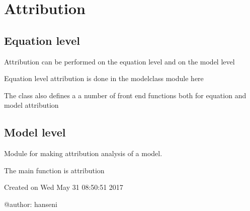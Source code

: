 \documentclass[letterpaper,10pt,english]{sphinxmanual}
\begin{document}
\chapter{Attribution}
\label{\detokenize{index:attribution}}

\section{Equation level}
\label{\detokenize{index:equation-level}}
\sphinxAtStartPar
Attribution can be performed on the equation level and on the model level

\sphinxAtStartPar
Equation level attribution is done in the modelclass module here  {\hyperref[\detokenize{index:modelclass.Dekomp_Mixin}]{}}

\sphinxAtStartPar
The class {\hyperref[\detokenize{index:modelclass.Dekomp_Mixin}]{}} also defines a a number of front end functions both for equation and model attribution


\section{Model level}
\label{\detokenize{index:module-modeldekom}}\label{\detokenize{index:model-level}}
\sphinxAtStartPar
Module for making attribution analysis of a model.

\sphinxAtStartPar
The main function is attribution

\sphinxAtStartPar
Created on Wed May 31 08:50:51 2017

\sphinxAtStartPar
@author: hanseni
\end{document}
